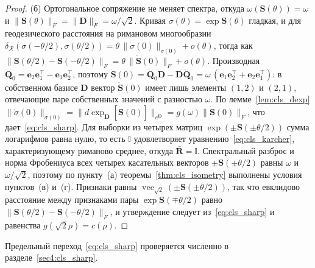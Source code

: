 \begin{proof}
(б) Ортогональное сопряжение не меняет спектра, откуда $\omega(\mathbf{S}(\theta)) = \omega$ и $\|\mathbf{S}(\theta)\|_F = \|\mathbf{D}\|_F = \omega/\sqrt{2}$. Кривая $\sigma(\theta) = \exp \mathbf{S}(\theta)$ гладкая, и для геодезического расстояния на римановом многообразии $\delta_{\mathcal{R}}(\sigma(-\theta/2), \sigma(\theta/2)) = \theta\,\|\dot{\sigma}(0)\|_{\sigma(0)} + o(\theta)$, тогда как $\|\mathbf{S}(\theta/2) - \mathbf{S}(-\theta/2)\|_F = \theta\,\|\dot{\mathbf{S}}(0)\|_F + o(\theta)$. Производная $\dot{\mathbf{Q}}_0 = \mathbf{e}_2\mathbf{e}_1^{\top} - \mathbf{e}_1\mathbf{e}_2^{\top}$, поэтому $\dot{\mathbf{S}}(0) = \dot{\mathbf{Q}}_0\mathbf{D} - \mathbf{D}\dot{\mathbf{Q}}_0 = \omega\,(\mathbf{e}_1\mathbf{e}_2^{\top} + \mathbf{e}_2\mathbf{e}_1^{\top})$: в собственном базисе $\mathbf{D}$ вектор $\dot{\mathbf{S}}(0)$ имеет лишь элементы $(1,2)$ и $(2,1)$, отвечающие паре собственных значений с разностью $\omega$. По лемме~\ref{lem:cls_dexp} $\|\dot{\sigma}(0)\|_{\sigma(0)} = \|d\exp_{\mathbf{D}}[\dot{\mathbf{S}}(0)]\|_{e^{\mathbf{D}}} = g(\omega)\|\dot{\mathbf{S}}(0)\|_F$, что дает~\eqref{eq:cls_sharp}. Для выборки из четырех матриц $\exp(\pm\mathbf{S}(\pm\theta/2))$ сумма логарифмов равна нулю, то есть $\mathbb{I}$ удовлетворяет уравнению~\eqref{eq:cls_karcher}, характеризующему риманово среднее, откуда $\bar{\mathbf{R}} = \mathbb{I}$. Спектральный разброс и норма Фробениуса всех четырех касательных векторов $\pm\mathbf{S}(\pm\theta/2)$ равны $\omega$ и $\omega/\sqrt{2}$, поэтому по пункту~(а) теоремы~\ref{thm:cls_isometry} выполнены условия пунктов~(в) и~(г). Признаки равны $\operatorname{vec}_{\sqrt{2}}(\pm\mathbf{S}(\pm\theta/2))$, так что евклидово расстояние между признаками пары $\exp\mathbf{S}(\mp\theta/2)$ равно $\|\mathbf{S}(\theta/2) - \mathbf{S}(-\theta/2)\|_F$, и утверждение следует из~\eqref{eq:cls_sharp} и равенства $g(\sqrt{2}\rho) = c(\rho)$.
\end{proof}

Предельный переход~\eqref{eq:cls_sharp} проверяется численно в разделе~\ref{sec4:cls_sharp}.

